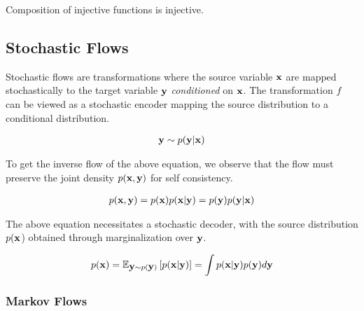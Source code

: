 \documentclass[a4paper, 11pt]{article}
\begin{document}
Composition of injective functions is injective.


\subsection{Stochastic Flows}
Stochastic flows are transformations where the source variable $\vx$ are mapped stochastically to the target variable $\vy$ \emph{conditioned} on $\vx$. The transformation $f$ can be viewed as a stochastic encoder mapping the source distribution to a conditional distribution.

\begin{align}
    \vy \sim p(\vy | \vx)
\end{align}

To get the inverse flow of the above equation, we observe that the flow must preserve the joint density $p(\vx, \vy)$ for self consistency.

\begin{align}
    p(\vx, \vy) = p(\vx)p(\vx | \vy) = p(\vy)p(\vy|\vx)
\end{align}

The above equation necessitates a stochastic decoder, with the source distribution $p(\vx$) obtained through marginalization over $\vy$.

\begin{align} \label{eq:sto_marg}
    p(\vx)= \E_{\vy \sim p(\vy) } \left [ p(\vx | \vy) \right ] = \int p(\vx | \vy) p(\vy) d\vy
\end{align}

\subsubsection{Markov Flows}
\end{document}

